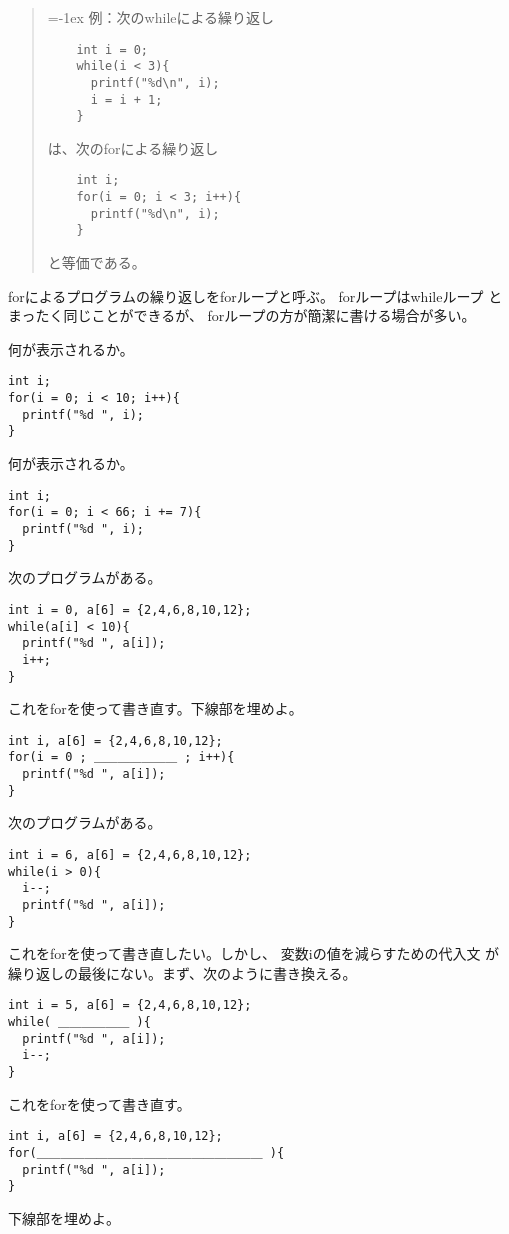 \documentclass[12pt,a4j]{jarticle}
\newcounter{toi}
\def\toi{%
\bigskip\bigskip\noindent
\addtocounter{toi}{1}
\shadowbox{\bfseries\large 問\thetoi}
\nopagebreak[4]\bigskip\nopagebreak[4]
}
\begin{document}
\begin{quote}\topsep=-1ex
例：次のwhileによる繰り返し
\begin{verbatim}
    int i = 0;
    while(i < 3){
      printf("%d\n", i);
      i = i + 1;
    }
\end{verbatim}
は、次のforによる繰り返し
\begin{verbatim}
    int i;
    for(i = 0; i < 3; i++){
      printf("%d\n", i);
    }
\end{verbatim}
と等価である。
\end{quote}


{\ttfamily for}によるプログラムの繰り返しを{\ttfamily for}ループと呼ぶ。
{\ttfamily for}ループは{\ttfamily while}ループ
とまったく同じことができるが、
{\ttfamily for}ループの方が簡潔に書ける場合が多い。


\toi

何が表示されるか。
\begin{verbatim}
int i;
for(i = 0; i < 10; i++){
  printf("%d ", i);
}
\end{verbatim}




\toi

何が表示されるか。
\begin{verbatim}
int i;
for(i = 0; i < 66; i += 7){
  printf("%d ", i);
}
\end{verbatim}




\toi

次のプログラムがある。
\begin{verbatim}
int i = 0, a[6] = {2,4,6,8,10,12};
while(a[i] < 10){
  printf("%d ", a[i]);
  i++;
}
\end{verbatim}
これを{\ttfamily for}を使って書き直す。下線部を埋めよ。
\begin{verbatim}
int i, a[6] = {2,4,6,8,10,12};
for(i = 0 ; ＿＿＿＿＿＿＿ ; i++){
  printf("%d ", a[i]);
}
\end{verbatim}






\toi

次のプログラムがある。
\begin{verbatim}
int i = 6, a[6] = {2,4,6,8,10,12};
while(i > 0){
  i--;
  printf("%d ", a[i]);
}
\end{verbatim}
これを{\ttfamily for}を使って書き直したい。しかし、
変数{\ttfamily i}の値を減らすための代入文
が繰り返しの最後にない。まず、次のように書き換える。
\begin{verbatim}
int i = 5, a[6] = {2,4,6,8,10,12};
while( ＿＿＿＿＿＿ ){
  printf("%d ", a[i]);
  i--;
}
\end{verbatim}
これを{\ttfamily for}を使って書き直す。
\begin{verbatim}
int i, a[6] = {2,4,6,8,10,12};
for(＿＿＿＿＿＿＿＿＿＿＿＿＿＿＿＿＿＿＿ ){
  printf("%d ", a[i]);
}
\end{verbatim}
下線部を埋めよ。
\end{document}
